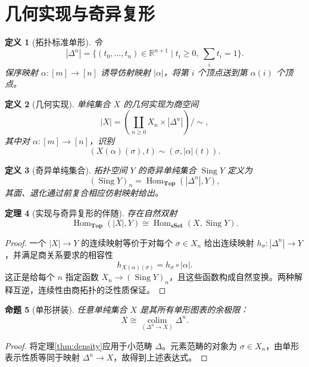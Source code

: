 \documentclass[12pt,oneside,openany,fontset=none]{ctexbook}
\theoremstyle{cn}
\newtheorem{definition}{定义}[chapter]
\newtheorem{proposition}[definition]{命题}
\newtheorem{theorem}[definition]{定理}
\numberwithin{equation}{chapter}
\newcommand{\Top}{\mathbf{Top}}
\newcommand{\sSet}{\mathbf{sSet}}
\newcommand{\Hom}{\operatorname{Hom}}
\newcommand{\R}{\mathbb R}
\newcommand{\colim}{\operatorname*{colim}}
\begin{document}
\section{几何实现与奇异复形}
\begin{definition}[拓扑标准单形]
令
\[
|\Delta^n|=\{(t_0,\ldots,t_n)\in\R^{n+1}\mid t_i\ge0,\ \sum_i t_i=1\}.
\]
保序映射 $\alpha:[m]\to[n]$ 诱导仿射映射 $|\alpha|$，将第 $i$ 个顶点送到第 $\alpha(i)$ 个顶点。
\end{definition}
\begin{definition}[几何实现]
单纯集合 $X$ 的几何实现为商空间
\[
|X|=\left(\coprod_{n\ge0}X_n\times|\Delta^n|\right)\big/\sim,
\]
其中对 $\alpha:[m]\to[n]$，识别
\[
(X(\alpha)(\sigma),t)\sim(\sigma,|\alpha|(t)).
\]
\end{definition}
\begin{definition}[奇异单纯集合]
拓扑空间 $Y$ 的奇异单纯集合 $\operatorname{Sing}Y$ 定义为
\[
(\operatorname{Sing}Y)_n=\Hom_{\Top}(|\Delta^n|,Y),
\]
其面、退化通过前复合相应仿射映射给出。
\end{definition}
\begin{theorem}[实现与奇异复形的伴随]
存在自然双射
\[
\Hom_{\Top}(|X|,Y)\cong\Hom_{\sSet}(X,\operatorname{Sing}Y).
\]
\end{theorem}
\begin{proof}
一个 $|X|\to Y$ 的连续映射等价于对每个 $\sigma\in X_n$ 给出连续映射 $h_\sigma:|\Delta^n|\to Y$，并满足商关系要求的相容性
\[
h_{X(\alpha)(\sigma)}=h_\sigma\circ|\alpha|.
\]
这正是给每个 $n$ 指定函数 $X_n\to(\operatorname{Sing}Y)_n$，且这些函数构成自然变换。两种解释互逆，连续性由商拓扑的泛性质保证。
\end{proof}
\begin{proposition}[单形拼装]
任意单纯集合 $X$ 是其所有单形图表的余极限：
\[
X\cong\colim_{(\Delta^n\to X)}\Delta^n.
\]
\end{proposition}
\begin{proof}
将定理\ref{thm:density}应用于小范畴 $\Delta$。元素范畴的对象为 $\sigma\in X_n$，由单形表示性质等同于映射 $\Delta^n\to X$，故得到上述表达式。
\end{proof}
\end{document}
